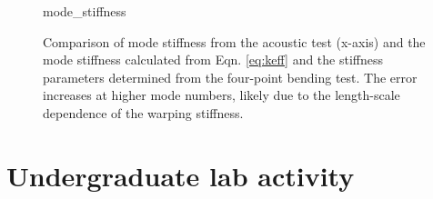 \documentclass[../thesis.tex]{subfiles}
\begin{document}
\begin{figure}
  {mode_stiffness}
  \caption{Comparison of mode stiffness from the acoustic test (x-axis) and the mode stiffness calculated from Eqn. \eqref{eq:keff} and the stiffness parameters determined from the four-point bending test. The error increases at higher mode numbers, likely due to the length-scale dependence of the warping stiffness.}
  \label{fig:keff}
\end{figure}


\section{Undergraduate lab activity}
\inprogress
\end{document}
